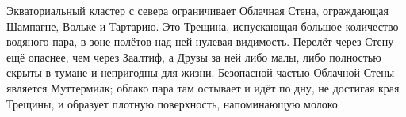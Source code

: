 \documentclass[a4paper,12pt,fleqn]{book}\usepackage{polyglossia}\setdefaultlanguage[babelshorthands=true]{russian}\setotherlanguage{english}\defaultfontfeatures{Ligatures=TeX,Mapping=tex-text}\usepackage{xcolor}\newcommand{\ml}[3]{#2}
\begin{document}
Экваториальный кластер с севера ограничивает Облачная Стена, ограждающая Шампагне, Вольке и Тартарию.
Это Трещина, испускающая большое количество водяного пара, в зоне полётов над ней нулевая видимость.
Перелёт через Стену ещё опаснее, чем через Заалтиф, а Друзы за ней либо малы, либо полностью скрыты в тумане и непригодны для жизни.
Безопасной частью Облачной Стены является Муттермилк;
облако пара там остывает и идёт по дну, не достигая края Трещины, и образует плотную поверхность, напоминающую молоко.
\end{document}
